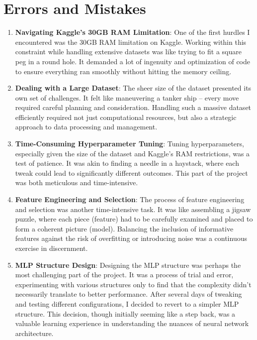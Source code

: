 \documentclass[12pt]{article}
\newtheorem{Proof of Lemma}{Proof of Lemma}
\begin{document}
\section{Errors and Mistakes}

\begin{enumerate}
  \item \textbf{Navigating Kaggle's 30GB RAM Limitation}: One of the first hurdles I encountered was the 30GB RAM limitation on Kaggle. Working within this constraint while handling extensive datasets was like trying to fit a square peg in a round hole. It demanded a lot of ingenuity and optimization of code to ensure everything ran smoothly without hitting the memory ceiling.

  \item \textbf{Dealing with a Large Dataset}: The sheer size of the dataset presented its own set of challenges. It felt like maneuvering a tanker ship – every move required careful planning and consideration. Handling such a massive dataset efficiently required not just computational resources, but also a strategic approach to data processing and management.
  
  \item \textbf{Time-Consuming Hyperparameter Tuning}: Tuning hyperparameters, especially given the size of the dataset and Kaggle's RAM restrictions, was a test of patience. It was akin to finding a needle in a haystack, where each tweak could lead to significantly different outcomes. This part of the project was both meticulous and time-intensive.
  
  \item \textbf{Feature Engineering and Selection}: The process of feature engineering and selection was another time-intensive task. It was like assembling a jigsaw puzzle, where each piece (feature) had to be carefully examined and placed to form a coherent picture (model). Balancing the inclusion of informative features against the risk of overfitting or introducing noise was a continuous exercise in discernment.
  
  \item \textbf{MLP Structure Design}: Designing the MLP structure was perhaps the most challenging part of the project. It was a process of trial and error, experimenting with various structures only to find that the complexity didn't necessarily translate to better performance. After several days of tweaking and testing different configurations, I decided to revert to a simpler MLP structure. This decision, though initially seeming like a step back, was a valuable learning experience in understanding the nuances of neural network architecture.
\end{enumerate}
\end{document}
